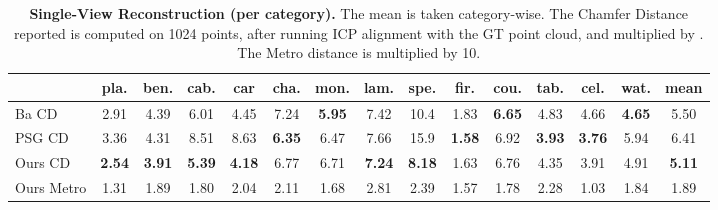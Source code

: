 \documentclass[10pt,twocolumn,letterpaper]{article}
\begin{document}
\begin{table*}[t!]
\centering
{
\small
  \begin{tabular}{l|c|c|c|c|c|c|c|c|c|c|c|c|c|c}
   &  pla. &  ben. &  cab. &  car &  cha. &  mon. &  lam. &  spe. &  fir. &  cou. &  tab. &  cel. &  wat. &  mean \\
  \hline
 Ba CD & 2.91 & 4.39 & 6.01 & 4.45 & 7.24 & \textbf{5.95} & 7.42 & 10.4 & 1.83 & \textbf{6.65} & 4.83 & 4.66 & \textbf{4.65} & 5.50 \\
{PSG CD} & 3.36 & 4.31 & 8.51 & 8.63 & \textbf{6.35} & 6.47 & 7.66 & 15.9 & \textbf{1.58} & 6.92 & \textbf{3.93} & \textbf{3.76} & 5.94 & 6.41  \\
 Ours CD & \textbf{2.54} & \textbf{3.91} & \textbf{5.39} & \textbf{4.18} & 6.77 & {6.71} & \textbf{7.24} & \textbf{8.18} & 1.63 & 6.76 & 4.35 & 3.91 & 4.91 & \textbf{5.11}  \\
 \hline
 \hline
Ours Metro& 1.31 & 1.89 & 1.80 & 2.04 & 2.11 & 1.68 & 2.81 & 2.39 & 1.57 & 1.78 & 2.28 & 1.03 & 1.84 & 1.89 \\
  \end{tabular}
  }
\medskip
\caption{\textbf{Single-View Reconstruction (per category).} The mean is taken category-wise. The Chamfer Distance reported is computed on 1024 points, after running ICP alignment with the GT point cloud, and multiplied by . The Metro distance is multiplied by 10.
  }
  \label{tab:SVR}
  \vspace{1mm}
\end{table*}

\setlength{\belowcaptionskip}{-1pt}
\end{document}
